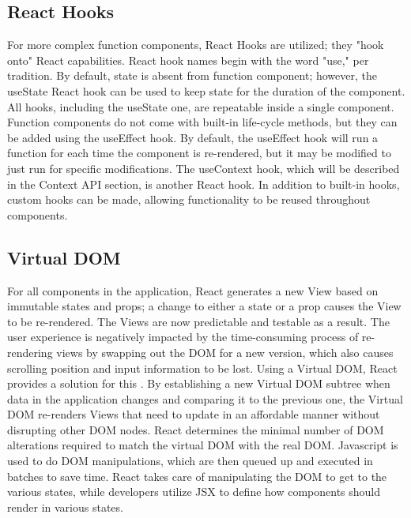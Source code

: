 \subsection{React Hooks}
For more complex function components, React Hooks are utilized; they "hook onto" React capabilities. React hook names begin with the word "use," per tradition. By default, state is absent from function component; however, the useState React hook can be used to keep state for the duration of the component. All hooks, including the useState one, are repeatable inside a single component.
Function components do not come with built-in life-cycle methods, but they can be added using the useEffect hook. By default, the useEffect hook will run a function for each time the component is re-rendered, but it may be modified to just run for specific modifications.
The useContext hook, which will be described in the Context API section, is another React hook. In addition to built-in hooks, custom hooks can be made, allowing functionality to be reused throughout components.

\subsection{Virtual DOM}
For all components in the application, React generates a new View based on immutable states and props; a change to either a state or a prop causes the View to be re-rendered. The Views are now predictable and testable as a result. The user experience is negatively impacted by the time-consuming process of re-rendering views by swapping out the DOM for a new version, which also causes scrolling position and input information to be lost. Using a Virtual DOM, React provides a solution for this \autocite{david2020building}.
By establishing a new Virtual DOM subtree when data in the application changes and comparing it to the previous one, the Virtual DOM re-renders Views that need to update in an affordable manner without disrupting other DOM nodes. React determines the minimal number of DOM alterations required to match the virtual DOM with the real DOM. Javascript is used to do DOM manipulations, which are then queued up and executed in batches to save time. React takes care of manipulating the DOM to get to the various states, while developers utilize JSX to define how components should render in various states.

